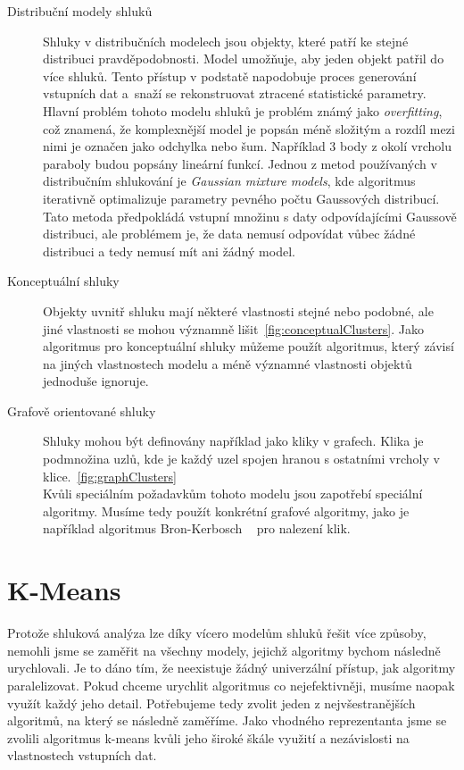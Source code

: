 \begin{description}
\item[Distribuční modely shluků] Shluky v distribučních modelech jsou objekty, kte\-ré patří ke stejné distribuci pravděpodobnosti. Model umožňuje, aby jeden objekt patřil do více shluků.
Tento přístup v podstatě napodobuje proces generování vstupních dat a~sna\-ží se rekonstruovat ztracené statistické parametry. Hlavní problém tohoto modelu shluků je problém známý jako \textit{overfitting}, což znamená, že komplexnější model je popsán méně složitým a rozdíl mezi nimi je označen jako odchylka nebo šum. Například 3 body z okolí vrcholu paraboly budou popsány lineární funkcí.
Jednou z metod používaných v distribučním shlukování je \textit {Gaussian mixture models}, kde algoritmus iterativně optimalizuje parametry pevného počtu Gaussových distribucí.
Tato metoda předpokládá vstupní množinu s daty odpovídajícími Gaussově distribuci, ale problémem je, že data nemusí od\-po\-ví\-dat vůbec žádné distribuci a tedy nemusí mít ani žádný model.

\item[Konceptuální shluky] Objekty uvnitř shluku mají některé vlastnosti stejné nebo podobné, ale jiné vlastnosti se mohou významně lišit~\autoref{fig:conceptualClusters}.
Jako algoritmus pro konceptuální shluky můžeme použít algoritmus, který závisí na jiných vlastnostech modelu a méně významné vlastnosti objektů jednoduše ignoruje.

\item[Grafově orientované shluky] Shluky mohou být definovány například jako kli\-ky v grafech. Klika je podmnožina uzlů, kde je každý uzel spojen hranou s ostatními vrcholy v klice.~\autoref{fig:graphClusters} \\
Kvůli speciálním požadavkům tohoto modelu jsou zapotřebí speciální algoritmy. Musíme tedy použít konkrétní grafové algoritmy, jako je například algoritmus Bron-Kerbosch ~\cite{Sun15} pro nalezení klik.
\end{description}

\section{K-Means} 
Protože shluková analýza lze díky vícero modelům shluků řešit více způsoby, nemohli jsme se zaměřit na všechny modely, jejichž algoritmy bychom následně urychlovali. Je to dáno tím, že neexistuje žádný univerzální přístup, jak algoritmy paralelizovat. Pokud chceme urychlit algoritmus co nejefektivněji, musíme naopak využít každý jeho detail. Potřebujeme tedy zvolit jeden z nej\-vše\-stra\-něj\-ších algoritmů, na který se následně zaměříme. Jako vhodného reprezentanta jsme se zvolili algoritmus k-means kvůli jeho široké škále využití a nezávislosti na vlastnostech vstupních dat. \\

